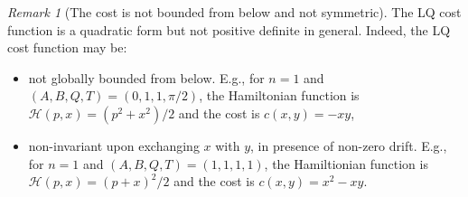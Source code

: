 \documentclass[reqno]{amsart}
\theoremstyle{plain}
\theoremstyle{definition}
\theoremstyle{remark}
\newtheorem{rem}[thm]{Remark}
\begin{document}
    \begin{rem}[The cost is not bounded from below and not symmetric]
	The LQ cost function is a quadratic form but not positive definite in general. Indeed, the LQ cost function may be:
    \begin{itemize}
        \item not globally bounded from below. E.g., for $n=1$ and $(A,B,Q,T)=(0,1,1,\pi/2)$, the Hamiltonian function is $\mathcal{H}(p,x)=(p^2+x^2)/2$ and the cost is $c(x,y)=-xy$,
        \item non-invariant upon exchanging $x$ with $y$, in presence of non-zero drift. E.g., for $n=1$ and $(A,B,Q,T)=(1,1,1,1)$, the Hamiltionian function is $\mathcal{H}(p,x)=(p+x)^2/2$ and the cost is $c(x,y)=x^2-xy$.
    \end{itemize}
    \end{rem}
\end{document}
